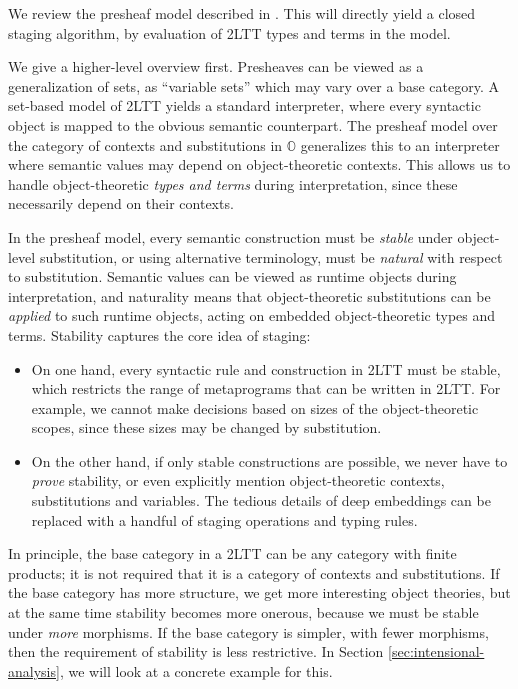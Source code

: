 \documentclass[acmsmall]{acmart}
\newcommand{\mbb}[1]{\mathbb{#1}}
\newcommand{\mbbo}{\mbb{O}}
\theoremstyle{remark}
\begin{document}
We review the presheaf model described in \cite[Section~2.5.3]{twolevel}.  This
will directly yield a closed staging algorithm, by evaluation of 2LTT types and
terms in the model.

We give a higher-level overview first. Presheaves can be viewed as a
generalization of sets, as ``variable sets'' which may vary over a base
category. A set-based model of 2LTT yields a standard interpreter, where every
syntactic object is mapped to the obvious semantic counterpart. The presheaf
model over the category of contexts and substitutions in $\mbbo$ generalizes
this to an interpreter where semantic values may depend on object-theoretic
contexts. This allows us to handle object-theoretic \emph{types and terms}
during interpretation, since these necessarily depend on their contexts.

In the presheaf model, every semantic construction must be \emph{stable} under
object-level substitution, or using alternative terminology, must be
\emph{natural} with respect to substitution. Semantic values can be viewed as
runtime objects during interpretation, and naturality means that
object-theoretic substitutions can be \emph{applied} to such runtime objects,
acting on embedded object-theoretic types and terms. Stability captures the core
idea of staging:
\begin{itemize}
\item On one hand, every syntactic rule and construction in 2LTT must
      be stable, which restricts the range of metaprograms
      that can be written in 2LTT. For example, we cannot make decisions
      based on sizes of the object-theoretic scopes, since these sizes may be changed
      by substitution.
\item On the other hand, if only stable constructions are possible, we never
      have to \emph{prove} stability, or even explicitly mention object-theoretic
      contexts, substitutions and variables. The tedious details of deep embeddings
      can be replaced with a handful of staging operations and typing rules.
\end{itemize}
In principle, the base category in a 2LTT can be any category with finite
products; it is not required that it is a category of contexts and substitutions.
If the base category has more structure, we get more interesting object
theories, but at the same time stability becomes more onerous, because we must
be stable under \emph{more} morphisms. If the base category is simpler, with
fewer morphisms, then the requirement of stability is less restrictive. In
Section \ref{sec:intensional-analysis}, we will look at a concrete example for this.
\end{document}
